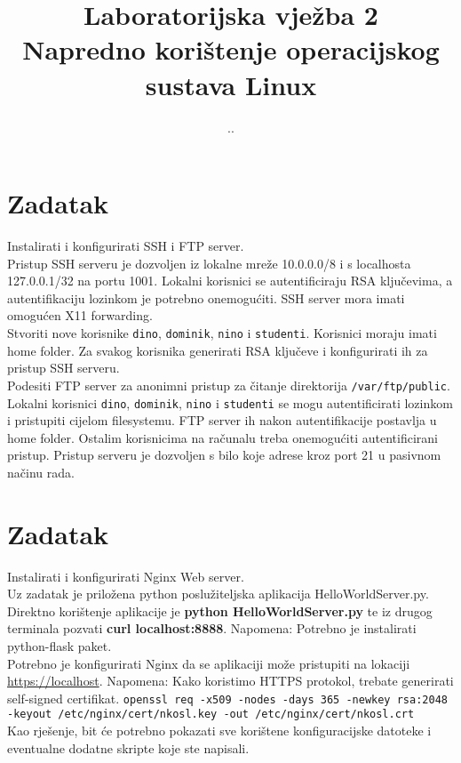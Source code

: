 \documentclass[12pt,a4paper]{article}
\renewcommand{\dateseparator}{.}
\newcommand{\todayiso}{\twodigit\day \dateseparator \twodigit\month \dateseparator \the \year}
\begin{document}
    \title{Laboratorijska vježba 2\\{\large Napredno korištenje operacijskog sustava Linux}}
    \date{\vspace{-5ex} \todayiso}
	\maketitle
	

\section{Zadatak}

Instalirati i konfigurirati SSH i FTP server.\\

Pristup SSH serveru je dozvoljen iz lokalne mreže 10.0.0.0/8 i s localhosta 127.0.0.1/32 na portu 1001. Lokalni korisnici se autentificiraju RSA ključevima, a autentifikaciju lozinkom je potrebno onemogućiti. SSH server mora imati omogućen X11 forwarding.\\
Stvoriti nove korisnike \texttt{dino}, \texttt{dominik}, \texttt{nino} i \texttt{studenti}. Korisnici moraju imati home folder. Za svakog korisnika generirati RSA ključeve i konfigurirati ih za pristup SSH serveru.\\

Podesiti FTP server za anonimni pristup za čitanje direktorija \texttt{/var/ftp/public}. Lokalni korisnici \texttt{dino}, \texttt{dominik}, \texttt{nino} i \texttt{studenti} se mogu autentificirati lozinkom i pristupiti cijelom filesystemu. FTP server ih nakon autentifikacije postavlja u home folder. Ostalim korisnicima na računalu treba onemogućiti autentificirani pristup. Pristup serveru je dozvoljen s bilo koje adrese kroz port 21 u pasivnom načinu rada.\\



\section{Zadatak}

Instalirati i konfigurirati Nginx Web server. \\

Uz zadatak je priložena python poslužiteljska aplikacija HelloWorldServer.py. \\
Direktno korištenje aplikacije je \textbf{python HelloWorldServer.py} te iz drugog terminala pozvati \textbf{curl localhost:8888}.
Napomena: Potrebno je instalirati python-flask paket. \\

Potrebno je konfigurirati Nginx da se aplikaciji može pristupiti na lokaciji \url{https://localhost}. 
Napomena: Kako koristimo HTTPS protokol, trebate generirati self-signed certifikat.
\texttt{openssl req -x509 -nodes -days 365 -newkey rsa:2048 -keyout /etc/nginx/cert/nkosl.key -out /etc/nginx/cert/nkosl.crt} \\


Kao rješenje, bit će potrebno pokazati sve korištene konfiguracijske datoteke i eventualne dodatne skripte koje ste napisali.
\end{document}
